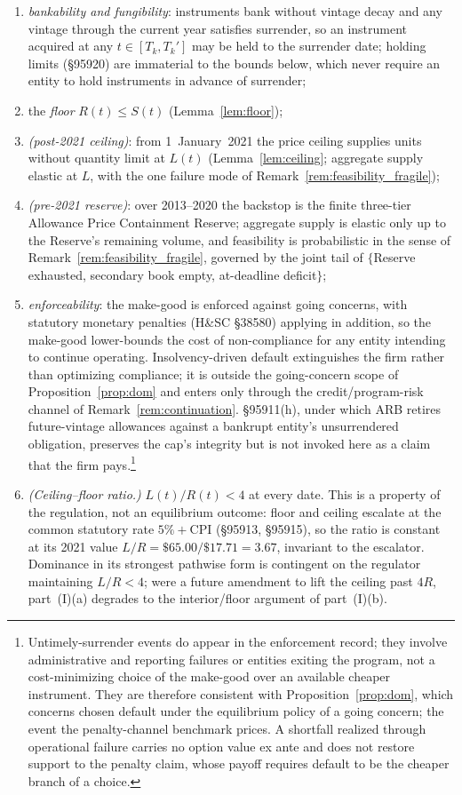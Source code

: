 \documentclass[11pt,letterpaper]{article}
\theoremstyle{plain}
\theoremstyle{definition}
\numberwithin{equation}{section}
\begin{document}
\begin{enumerate} 
\item[(A1)] \emph{bankability and fungibility}: instruments bank without vintage decay and any vintage through the current year satisfies surrender, so an instrument acquired at any $t\in[T_k,T_k']$ may be held to the surrender date; holding limits (\S95920) are immaterial to the bounds below, which never require an entity to hold instruments in advance of surrender;
\item[(A2)] the \emph{floor} $R(t)\le S(t)$ (Lemma~\ref{lem:floor});
\item[(A3-a)] \emph{(post-2021 ceiling)}: from 1~January~2021 the price ceiling supplies units without quantity limit at $L(t)$ (Lemma~\ref{lem:ceiling}; aggregate supply elastic at $L$, with the one failure mode of Remark~\ref{rem:feasibility_fragile});
\item[(A3-b)] \emph{(pre-2021 reserve)}: over 2013--2020 the backstop is the finite three-tier Allowance Price Containment Reserve; aggregate supply is elastic only up to the Reserve's remaining volume, and feasibility is probabilistic in the sense of Remark~\ref{rem:feasibility_fragile}, governed by the joint tail of $\{$Reserve exhausted, secondary book empty, at-deadline deficit$\}$;
\item[(A4)] \emph{enforceability}: the make-good is enforced against going concerns, with statutory monetary penalties (H\&SC \S38580) applying in addition, so the make-good lower-bounds the cost of non-compliance for any entity intending to continue operating. Insolvency-driven default extinguishes the firm rather than optimizing compliance; it is outside the going-concern scope of Proposition~\ref{prop:dom} and enters only through the credit/program-risk channel of Remark~\ref{rem:continuation}. \S95911(h), under which ARB retires future-vintage allowances against a bankrupt entity's unsurrendered obligation, preserves the cap's integrity but is not invoked here as a claim that the firm pays.\footnote{Untimely-surrender events do appear in the enforcement record; they involve administrative and reporting failures or entities exiting the program, not a cost-minimizing choice of the make-good over an available cheaper instrument. They are therefore consistent with Proposition~\ref{prop:dom}, which concerns chosen default under the equilibrium policy of a going concern; the event the penalty-channel benchmark prices. A shortfall realized through operational failure carries no option value ex ante and does not restore support to the penalty claim, whose payoff requires default to be the cheaper branch of a choice.}
\item[(A5)] \emph{(Ceiling–floor ratio.)} $L(t)/R(t)<4$ at every date. This is a property of the regulation, not an equilibrium outcome: floor and ceiling escalate at the common statutory rate $5\%+\mathrm{CPI}$ (\S95913, \S95915), so the ratio is constant at its 2021 value $L/R=\$65.00/\$17.71=3.67$, invariant to the escalator. Dominance in its strongest pathwise form is contingent on the regulator maintaining $L/R<4$; were a future amendment to lift the ceiling past $4R$, part~(I)(a) degrades to the interior/floor argument of part~(I)(b).
\end{enumerate}
\end{document}
